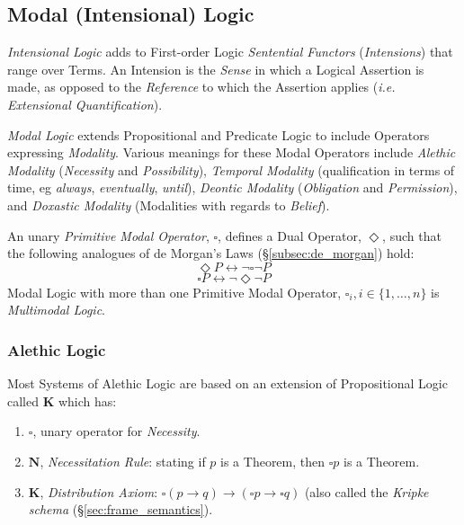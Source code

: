 \documentclass{article}
\begin{document}
\subsection{Modal (Intensional) Logic} \label{subsec:modal_logic}

\emph{Intensional Logic} adds to First-order Logic \emph{Sentential
  Functors} (\emph{Intensions}) that range over Terms. An Intension is
the \emph{Sense} in which a Logical Assertion is made, as opposed to
the \emph{Reference} to which the Assertion applies (\emph{i.e.
  Extensional Quantification}).

\emph{Modal Logic} extends Propositional and Predicate Logic to
include Operators expressing \emph{Modality}. Various meanings for
these Modal Operators include \emph{Alethic Modality}
(\emph{Necessity} and \emph{Possibility}), \emph{Temporal Modality}
(qualification in terms of time, eg \emph{always}, \emph{eventually},
\emph{until}), \emph{Deontic Modality} (\emph{Obligation} and
\emph{Permission}), and \emph{Doxastic Modality} (Modalities with
regards to \emph{Belief}).

An unary \emph{Primitive Modal Operator}, $\square$, defines a Dual
Operator, $\Diamond$, such that the following analogues of de Morgan's
Laws (\S\ref{subsec:de_morgan}) hold:
    \[\Diamond P \leftrightarrow \neg \square \neg P\]
    \[\square P \leftrightarrow \neg \Diamond \neg P\]
Modal Logic with more than one Primitive Modal Operator, $\square _i,
i \in \{1, \ldots, n\}$ is \emph{Multimodal Logic}.

\subsubsection{Alethic Logic}\label{subsec:alethic_logic}

Most Systems of Alethic Logic are based on an extension of
Propositional Logic called $\mathbf{K}$ which has:

\begin{enumerate}
\item $\square$, unary operator for \emph{Necessity}.
\item $\mathbf{N}$, \emph{Necessitation Rule}: stating if $p$ is a
  Theorem, then $\square p$ is a Theorem.
\item $\mathbf{K}$, \emph{Distribution Axiom}: $\square(p \rightarrow
  q) \rightarrow (\square p \rightarrow \square q)$ (also called the
  \emph{Kripke schema} (\S\ref{sec:frame_semantics}).
\end{enumerate}
\end{document}
